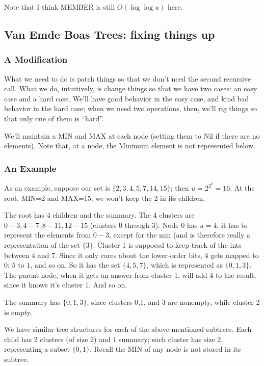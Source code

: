\documentclass{article}
\begin{document}
Note that I think MEMBER is still $O(\log\log u)$ here.

\subsection{Van Emde Boas Trees: fixing things up}

\subsubsection{A Modification}

What we need to do is patch things so that we don't need the second recursive
call.
What we do, intuitively, is change things so that we have two cases: an
easy case and a hard case.
We'll have good behavior in the easy case, and kind bad behavior in the
hard case; when we need two operations, then, we'll rig things so that
only one of them is ``hard''.

We'll maintain a MIN and MAX at each node (setting them to Nil if there are
no elements).
Note that, at a node, the Minimum element is not represented below.

\subsubsection{An Example}

As an example, suppose our set is $\{2,3,4,5,7,14,15\}$; then $u = 2^{2^2} = 16$.
At the root, MIN=2 and MAX=15; we won't keep the 2 in its children.

The root has 4 children and the summary.
The 4 clusters are $0-3, 4-7, 8-11, 12-15$ (clusters 0 through 3).
Node 0 has $u=4$; it has to represent the elements from $0-3$, except
for the min (and is therefore really a representation of the set $\{3\}$.
Cluster 1 is suppoesd to keep track of the ints between $4$ and $7$.
Since it only cares about the lower-order bits, $4$ gets mapped to $0$; 
$5$ to $1$, and so on.
So it has the set $\{4,5,7\}$, which is represented as $\{0,1,3\}$.
The parent node, when it gets an answer from cluster 1, will add 4 to
the result, since it knows it's cluster 1.
And so on.

The summary has $\{0,1,3\}$, since clusters 0,1, and 3 are nonempty, while
cluster 2 is empty.

We have similar tree structures for each of the above-mentioned subtrees.
Each child has 2 clusters (of size 2) and 1 summary; each cluster has
size 2, representing a subset $\{0,1\}$.
Recall the MIN of any node is not stored in its subtree.
\end{document}
